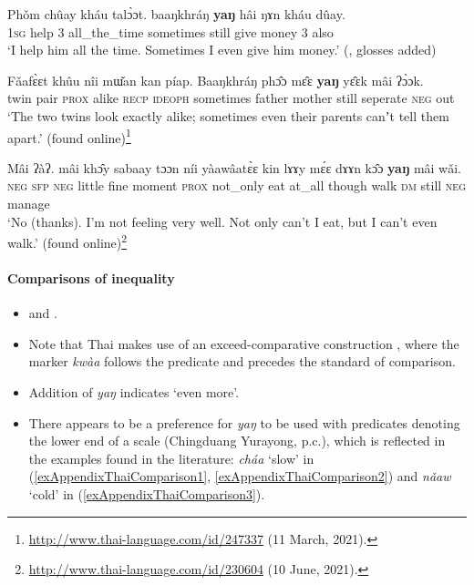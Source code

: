 \begin{exe}

	\ex\label{exAppendixThaiScalarAdditive1}
\gll Phǒm	chûay	kháu	talɔ̀ɔt.		baaŋkhráŋ	\textbf{yaŋ}	hâi	ŋɤn		kháu	dûay.\\
1\textsc{sg} help 3 all\_the\_time sometimes still give money 3 also\\
	\glt \lq I help him all the time. Sometimes I even give him money.' (\cite[240]{HigbieThinsan2002}, glosses added)


	\ex\label{exAppendixThaiScalarAdditive2}
	 \gll Fǎafɛ̀ɛt	khûu	nîi	mɯ̌an	kan		píap. Baaŋkhráŋ	phɔ̂ɔ		mɛ̂ɛ		\textbf{yaŋ}		yɛ̂ɛk		mâi		ʔɔ̀ɔk.\\
twin		pair	\textsc{prox}	alike	\textsc{recp} \textsc{ideoph}	sometimes father mother still seperate \textsc{neg} out\\
	\glt \lq The two twins look exactly alike; sometimes even their parents canʼt tell them apart.' (found online)\footnote{\url{http://www.thai-language.com/id/247337} (11 March, 2021).}

	\ex\label{exAppendixThaiScalarAdditive3}
	\gll Mâi	ʔàʔ.	mâi	khɔ̂y	sabaay	tɔɔn		níi yàawâatɛ̀ɛ	kin	lɤɤy		mɛ́ɛ		dɤɤn	kɔ̂ɔ	\textbf{yaŋ}	mâi	wǎi.\\
	\textsc{neg} \textsc{sfp} \textsc{neg} little {fine} moment \textsc{prox} not\_only eat at\_all though walk \textsc{dm} still \textsc{neg} manage\\
	\glt \lq No (thanks). I\rq{}m not feeling very well. Not only can\rq{}t I eat, but I can\rq{}t even walk.' (found online)\footnote{\url{http://www.thai-language.com/id/230604} (10 June, 2021).}
\end{exe}

\pagebreak
\paragraph{Comparisons of inequality}\label{appendixThaiComparisons}
\begin{itemize}
	\sloppy
	\item \textcite[240]{HigbieThinsan2002} and \textcite[21]{Zhang2017}.
	\item Note that Thai makes use of an exceed-comparative construction \parencite{Stassen2013}, where the marker \textit{kwàa} follows the predicate and precedes the standard of comparison.
	\item Addition of \textit{yaŋ} indicates \lq even more\rq{}.
	\item There appears to be a preference for \textit{yaŋ} to be used with predicates denoting the lower end of a scale (Chingduang Yurayong, p.c.), which is reflected in the examples found in the literature: \textit{cháa} \lq slow' in (\ref{exAppendixThaiComparison1}, \ref{exAppendixThaiComparison2}) and \textit{nǎaw} \lq cold' in (\ref{exAppendixThaiComparison3}).
\end{itemize}

